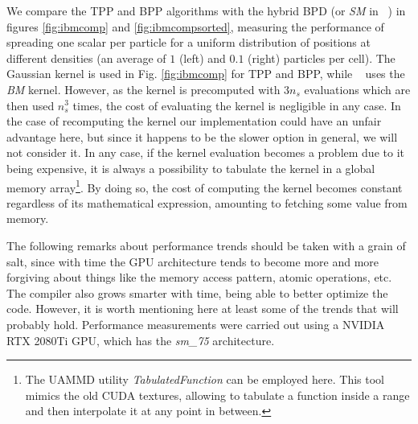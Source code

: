 \documentclass[ twoside,openright,titlepage,numbers=noenddot,%
headinclude,footinclude,cleardoublepage=empty,abstract=on,
BCOR=5mm,paper=b5,fontsize=11pt, dvipsnames
]{scrreprt}
\newcommand{\uammd}{\gls{UAMMD}\xspace}
\newcommand{\gpu}{\gls{GPU}\xspace}
\begin{document}
We compare the TPP and BPP algorithms with the hybrid BPD (or \emph{SM} in ~\cite{Shih2021}) in figures \ref{fig:ibmcomp} and \ref{fig:ibmcompsorted}, measuring the performance of spreading one scalar per particle for a uniform distribution of positions at different densities (an average of $1$ (left) and $0.1$ (right) particles per cell). The Gaussian kernel is used in Fig. \ref{fig:ibmcomp} for TPP and BPP, while ~\cite{Shih2021} uses the \emph{BM} kernel. However, as the kernel is precomputed with $3n_s$ evaluations which are then used $n_s^3$ times, the cost of evaluating the kernel is negligible in any case. In the case of recomputing the kernel our implementation could have an unfair advantage here, but since it happens to be the slower option in general, we will not consider it.
In any case, if the kernel evaluation becomes a problem due to it being expensive, it is always a possibility to tabulate the kernel in a global memory array\footnote{The \uammd utility \emph{TabulatedFunction} can be employed here. This tool mimics the old CUDA textures, allowing to tabulate a function inside a range and then interpolate it at any point in between.}. By doing so, the cost of computing the kernel becomes constant regardless of its mathematical expression, amounting to fetching some value from memory.

The following remarks about performance trends should be taken with a grain of salt, since with time the \gpu architecture tends to become more and more forgiving about things like the memory access pattern, atomic operations, etc. The compiler also grows smarter with time, being able to better optimize the code. However, it is worth mentioning here at least some of the trends that will probably hold. Performance measurements were carried out using a NVIDIA RTX 2080Ti \gpu, which has the \emph{sm\_75} architecture.
\end{document}
